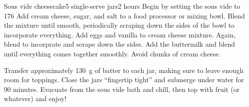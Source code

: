 \begin{recipe}{Sous vide cheesecake}{5 single-serve jars}{2 hours}
  Begin by setting the sous vide to \SI{176}{\fahrenheit}
  Add cream cheese, sugar, and salt to a food processor or mixing bowl. Blend the mixture until smooth, periodically scraping down the sides of the bowl to incorporate everything.
  Add eggs and vanilla to cream cheese mixture. Again, blend to incorprate and scrape down the sides.
  Add the buttermilk and blend until everything comes together smoothly. Avoid chunks of cream cheese.

  Transfer approximately \SI{130}{\gram} of batter to each jar, making sure to leave enough room for toppings. Close the jars ``fingertip tight'' and submerge under water for 90 minutes. Evacuate from the sous vide bath and chill, then top with fruit (or whatever) and enjoy!
\end{recipe}
